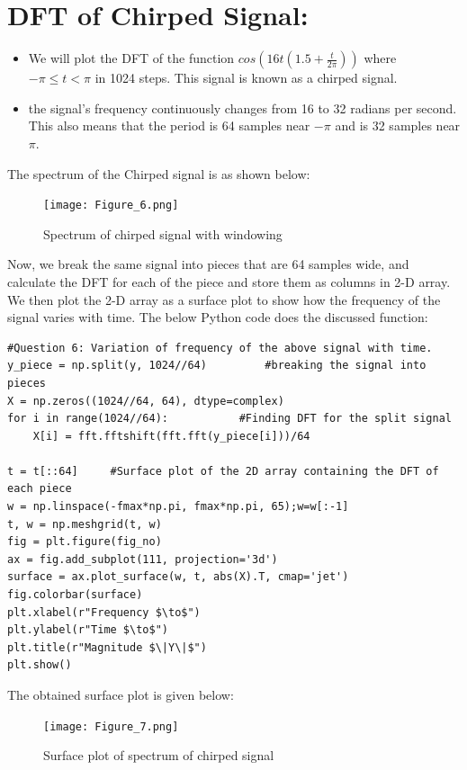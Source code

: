 \documentclass[11pt, a4paper]{article}
\begin{document}
\section{DFT of Chirped Signal:}
\begin{itemize}
    \item We will plot the DFT of the function $cos(16t(1.5 + \frac{t}{2\pi}))$ where $-\pi\le t <\pi$ in 1024 steps. This signal is known as a chirped signal.
    \item the signal's frequency continuously changes from 16 to 32 radians per second. This also means that the period is 64 samples near $-\pi$ and is 32 samples near $\pi$.
\end{itemize}
The spectrum of the Chirped signal is as shown below:
            \begin{figure}[H]
            \centering
            \texttt{[image: Figure\_6.png]}
            \caption{Spectrum of chirped signal with windowing}
            \label{fig:Fig7}
        \end{figure}
Now, we break the same signal into pieces that are 64 samples wide, and calculate the DFT for each of the piece and store them as columns in 2-D array.\newline
We then plot the 2-D array as a surface plot to show how the frequency of the signal varies with time. The below Python code does the discussed function:
    \lstset{language=Python}
    \lstset{basicstyle=\footnotesize}
    \begin{lstlisting}
#Question 6: Variation of frequency of the above signal with time.
y_piece = np.split(y, 1024//64)         #breaking the signal into pieces
X = np.zeros((1024//64, 64), dtype=complex)     
for i in range(1024//64):           #Finding DFT for the split signal
    X[i] = fft.fftshift(fft.fft(y_piece[i]))/64

t = t[::64]     #Surface plot of the 2D array containing the DFT of each piece
w = np.linspace(-fmax*np.pi, fmax*np.pi, 65);w=w[:-1]
t, w = np.meshgrid(t, w)
fig = plt.figure(fig_no)
ax = fig.add_subplot(111, projection='3d')
surface = ax.plot_surface(w, t, abs(X).T, cmap='jet')
fig.colorbar(surface)
plt.xlabel(r"Frequency $\to$")
plt.ylabel(r"Time $\to$")
plt.title(r"Magnitude $\|Y\|$")
plt.show()
    \end{lstlisting}
    The obtained surface plot is given below:
         \begin{figure}[H]
            \centering
            \texttt{[image: Figure\_7.png]}
            \caption{Surface plot of spectrum of chirped signal}
            \label{fig:Fig8}
        \end{figure}
\end{document}
